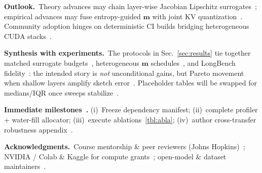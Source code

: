 \documentclass[conference]{IEEEtran}
\begin{document}
\textbf{Outlook.}\ Theory advances may chain layer-wise Jacobian Lipschitz surrogates~\cite{lipschitz2024}; empirical advances may fuse entropy-guided \(\mathbf{m}\) with joint KV quantization~\cite{kivi2024}. Community adoption hinges on deterministic CI builds bridging heterogeneous CUDA stacks~\cite{qjlkernel,zandieh2024aqjl-repo}.

\textbf{Synthesis with experiments.}\ The protocols in Sec.~\ref{sec:results} tie together matched surrogate budgets~\cite{presentation_mqjl}, heterogeneous \(\mathbf{m}\) schedules~\cite{zandieh2024aqjl-repo}, and LongBench fidelity~\cite{bai2023longbench}: the intended story is \emph{not} unconditional gains, but Pareto movement when shallow layers amplify sketch error~\cite{fpguide2018,lipschitz2024}. Placeholder tables will be swapped for medians/IQR once sweeps stabilize~\cite{presentation_mqjl}.

\textbf{Immediate milestones~\cite{presentation_mqjl}.} (i)~Freeze dependency manifest; (ii)~complete profiler + water-fill allocator; (iii)~execute ablations~\ref{tbl:abla}; (iv)~author cross-transfer robustness appendix~\cite{presentation_mqjl}.

\noindent
\textbf{Acknowledgments.}\ Course mentorship \& peer reviewers (Johns Hopkins)~\cite{presentation_mqjl}; NVIDIA / Colab \& Kaggle for compute grants~\cite{presentation_mqjl}; open-model \& dataset maintainers~\cite{touvron2023llama,bai2023longbench}.

\vspace{-0.08in}
\end{document}
